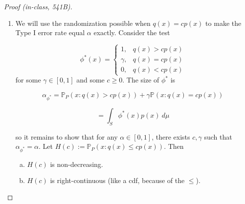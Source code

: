 \begin{proof}[Proof (in-class, 541B)]
\begin{enumerate}
\[
0 \leq \beta^*(\theta_1) - \beta(\theta_1) - c \left[ \beta^*(\theta_0) - \beta(\theta_0) \right] \leq \beta^*(\theta_1) - \beta(\theta_1);
\]

that is, \(\beta^*\) is UMP over all level \(\alpha\) tests.

(Notes from class:)

\[
= \E_Q \phi^* - \E_Q \phi - c \left( \E_p \phi^* - \E_p \phi \right) = 
\]

. Since \(\E_P \phi^* = \alpha\) and \(\E_P \phi \leq \alpha\),  \(\E_p \phi^* - \E_p \phi  \geq 0\). But \(\E_Q \phi^* - \E_Q \phi  \geq c \left( \E_p \phi^* - \E_p \phi \right)\) \textbf{(why?)}, so 

\[
\E_Q \phi^* = \beta_{\phi^*} \geq \E_Q \phi = \beta_\phi
\]

So the power of \(\phi^*\) is greater than or equal to the power of \(\phi\).

\item

We will use the randomization possible when \(q(x) = c p(x)\) to make the Type I error rate equal \(\alpha\) exactly. Consider the test 

\begin{equation}\label{mathstats.np.test.form}
\phi^*(x) = \begin{cases}
1, & q(x) > c p(x) \\
\gamma, & q(x) = c p(x) \\
0, & q(x) < c p(x)
\end{cases}
\end{equation}
for some \(\gamma \in [0,1]\) and some \(c \geq 0\). The size of \(\phi^*\) is 

\[
\alpha_{\phi^*} = \mathbb{P}_P(x : q(x) > c p(x)) + \gamma  \mathbb{P}(x : q(x) = c p(x))
\]

\[
= \int_S \phi^*(x) p(x) \ d\mu
\]

so it remains to show that for any \(\alpha \in [0,1]\), there exists \(c, \gamma\) such that \(\alpha_{\phi^*} = \alpha\). Let \(H(c) := \mathbb{P}_P(x: q(x) \leq c p (x) )\). Then

\begin{enumerate}[(a)]

\item \(H(c)\) is non-decreasing.

\item \(H(c)\) is right-continuous (like a cdf, because of the \(\leq\)).

\end{enumerate}


\end{enumerate}
\end{proof}
